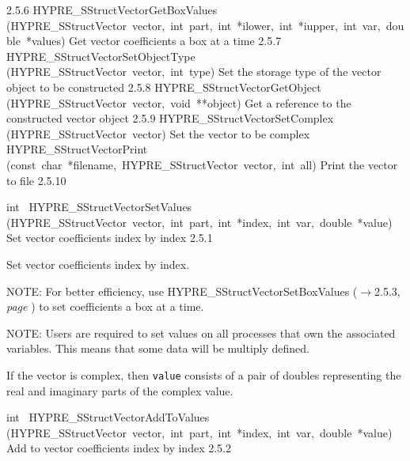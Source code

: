 \documentclass{article}
\begin{document}
\begin{cxxentry}
\begin{cxxentry}
\begin{cxxnames}
        {2.5.6}
        {HYPRE\_SStructVectorGetBoxValues}
        {(HYPRE\_SStructVector\ vector,\ int\ part,\ int\ *ilower,\ int\ *iupper,\ int\ var,\ double\ *values)}
        {
Get vector coefficients a box at a time}
        {2.5.7}
        {HYPRE\_SStructVectorSetObjectType}
        {(HYPRE\_SStructVector\ vector,\ int\ type)}
        {
Set the storage type of the vector object to be constructed}
        {2.5.8}
        {HYPRE\_SStructVectorGetObject}
        {(HYPRE\_SStructVector\ vector,\ void\ **object)}
        {
Get a reference to the constructed vector object}
        {2.5.9}
        {HYPRE\_SStructVectorSetComplex}
        {(HYPRE\_SStructVector\ vector)}
        {
Set the vector to be complex}
        {}
\label{cxx.2.5.16}
        {HYPRE\_SStructVectorPrint}
        {(const\ char\ *filename,\ HYPRE\_SStructVector\ vector,\ int\ all)}
        {
Print the vector to file}
        {2.5.10}
\end{cxxnames}
\begin{cxxfunction}
{int\ }
        {HYPRE\_SStructVectorSetValues}
        {(HYPRE\_SStructVector\ vector,\ int\ part,\ int\ *index,\ int\ var,\ double\ *value)}
        {
Set vector coefficients index by index}
        {2.5.1}
\begin{cxxdoc}

Set vector coefficients index by index.

NOTE: For better efficiency, use HYPRE\_SStructVectorSetBoxValues ($\rightarrow$2.5.3, {\em page \pageref{cxx.2.5.3}}) to set
coefficients a box at a time.

NOTE: Users are required to set values on all processes that own the
associated variables.  This means that some data will be multiply defined.

If the vector is complex, then {\tt value} consists of a pair of doubles
representing the real and imaginary parts of the complex value.


\end{cxxdoc}
\end{cxxfunction}
\begin{cxxfunction}
{int\ }
        {HYPRE\_SStructVectorAddToValues}
        {(HYPRE\_SStructVector\ vector,\ int\ part,\ int\ *index,\ int\ var,\ double\ *value)}
        {
Add to vector coefficients index by index}
        {2.5.2}
\begin{cxxdoc}


\end{cxxdoc}
\end{cxxfunction}
\end{cxxentry}
\end{cxxentry}
\end{document}
